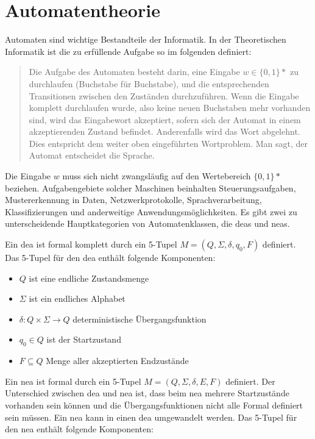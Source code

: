 \section{Automatentheorie}\label{automatatheory}
Automaten sind wichtige Bestandteile der Informatik. In der Theoretischen Informatik ist die zu erfüllende Aufgabe so im folgenden definiert:

\begin{quote}
\glqq Die Aufgabe des Automaten besteht darin, eine Eingabe $w \in \{0, 1 \}\ast$ zu
durchlaufen (Buchstabe für Buchstabe), und die entsprechenden Transitionen
zwischen den Zuständen durchzuführen. Wenn die Eingabe komplett
durchlaufen wurde, also keine neuen Buchstaben mehr vorhanden sind, wird
das Eingabewort akzeptiert, sofern sich der Automat in einem akzeptierenden
Zustand befindet. Anderenfalls wird das Wort abgelehnt. Dies entspricht dem
weiter oben eingeführten Wortproblem. Man sagt, der Automat entscheidet
die Sprache.\grqq \cite{theororeticalinformatic}
\end{quote}

Die Eingabe $w$ muss sich nicht zwangsläufig auf den Wertebereich $\{0, 1 \}\ast$ beziehen. Aufgabengebiete solcher Maschinen beinhalten Steuerungsaufgaben, Mustererkennung in Daten, Netzwerkprotokolle, Sprachverarbeitung, Klassifizierungen und anderweitige Anwendungsmöglichkeiten. Es gibt zwei zu unterscheidende Hauptkategorien von Automatenklassen, die \acp{dea} und \acp{nea}.

Ein \ac{dea} ist formal komplett durch ein 5-Tupel $M = (Q, \Sigma, \delta, q_0, F)$ definiert. Das 5-Tupel für den \ac{dea} enthält folgende Komponenten:

\begin{itemize}
  \setlength\itemsep{-0.6em}
\item $Q$  ist eine endliche Zustandsmenge
\item $\Sigma$ ist ein endliches Alphabet
\item $\delta:Q \times \Sigma \rightarrow Q$ deterministische Übergangsfunktion
\item $q_0 \in Q$ ist der Startzustand
\item $F \subseteq Q$ Menge aller akzeptierten Endzustände
\end{itemize}


Ein \ac{nea} ist formal durch ein 5-Tupel $M = (Q, \Sigma, \delta, E, F)$ definiert. Der Unterschied zwischen \ac{dea} und \ac{nea} ist, dass beim \ac{nea} mehrere Startzustände vorhanden sein können und die Übergangsfunktionen nicht alle Formal definiert sein müssen. Ein \ac{nea} kann in einen \ac{dea} umgewandelt werden. Das 5-Tupel für den \ac{nea} enthält folgende Komponenten:

